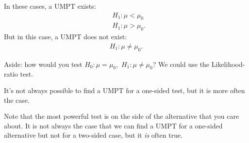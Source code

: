 \begin{eg}
	In these cases, a UMPT exists: 
	\begin{align*}
		&H_1:\mu<\mu_0 \\
		&H_1: \mu>\mu_0
	.\end{align*}
	But in this case, a UMPT does not exist:
	\begin{align*}
		H_1:\mu\neq \mu_0
	.\end{align*}

	\begin{remark}
Aside: how would you test $H_0: \mu=\mu_0,$ $H_1:\mu\neq \mu_0 $? We could use the Likelihood-ratio test. 
	\end{remark}

\end{eg}

\begin{remark}
It's not always possible to find a UMPT for a one-sided test, but it is more often the case.
\end{remark}


Note that the most powerful test is on the side of the alternative that you care about. It is not always the case that we can find a UMPT for a one-sided alternative but not for a two-sided case, but it \textit{is} often true. 

